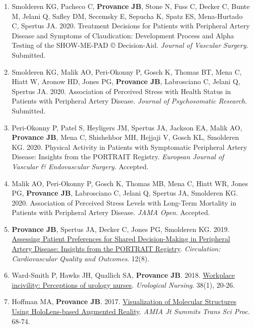 \documentclass[
]{article}
\begin{document}
\begin{enumerate}
\def\labelenumi{\arabic{enumi}.}
\item
  Smolderen KG, Pacheco C, \textbf{Provance JB}, Stone N, Fuss C, Decker
  C, Bunte M, Jelani Q, Safley DM, Secemsky E, Sepucha K, Spatz ES,
  Mena-Hurtado C, Spertus JA. 2020. Treatment Decisions for Patients
  with Peripheral Artery Disease and Symptoms of Claudication:
  Development Process and Alpha Testing of the SHOW-ME-PAD ©
  Decision-Aid. \emph{Journal of Vascular Surgery}. Submitted.
\item
  Smolderen KG, Malik AO, Peri-Okonny P, Gosch K, Thomas BT, Mena C,
  Hiatt W, Aronow HD, Jones PG, \textbf{Provance JB}, Labrosciano C,
  Jelani Q, Spertus JA. 2020. Association of Perceived Stress with
  Health Status in Patients with Peripheral Artery Disease.
  \emph{Journal of Psychosomatic Research}. Submitted.
\item
  Peri-Okonny P, Patel S, Heyligers JM, Spertus JA, Jackson EA, Malik
  AO, \textbf{Provance JB}, Mena C, Shishehbor MH, Hejjaji V, Gosch KL,
  Smolderen KG. 2020. Physical Activity in Patients with Symptomatic
  Peripheral Artery Disease: Insights from the PORTRAIT Registry.
  \emph{European Journal of Vascular \& Endovascular Surgery}. Accepted.
\item
  Malik AO, Peri-Okonny P, Gosch K, Thomas MB, Mena C, Hiatt WR, Jones
  PG, \textbf{Provance JB}, Labrosciano C, Jelani Q, Spertus JA,
  Smolderen KG. 2020. Association of Perceived Stress Levels with
  Long-Term Mortality in Patients with Peripheral Artery Disease.
  \emph{JAMA Open}. Accepted.
\item
  \textbf{Provance JB}, Spertus JA, Decker C, Jones PG, Smolderen KG.
  2019.
  \href{https://www.ahajournals.org/doi/full/10.1161/CIRCOUTCOMES.119.005730}{Assessing
  Patient Preferences for Shared Decision-Making in Peripheral Artery
  Disease: Insights from the PORTRAIT Registry}. \emph{Circulation:
  Cardiovascular Quality and Outcomes}. 12(8).
\item
  Ward-Smith P, Hawks JH, Quallich SA, \textbf{Provance JB}. 2018.
  \href{https://library.suna.org/suna/articles/1215/view}{Workplace
  incivility: Perceptions of urology nurses}. \emph{Urological Nursing}.
  38(1), 20-26.
\item
  Hoffman MA, \textbf{Provance JB}. 2017.
  \href{https://www.ncbi.nlm.nih.gov/pmc/articles/PMC5543343/}{Visualization
  of Molecular Structures Using HoloLens-based Augmented Reality}.
  \emph{AMIA Jt Summits Trans Sci Proc}. 68-74.
\end{enumerate}
\end{document}
